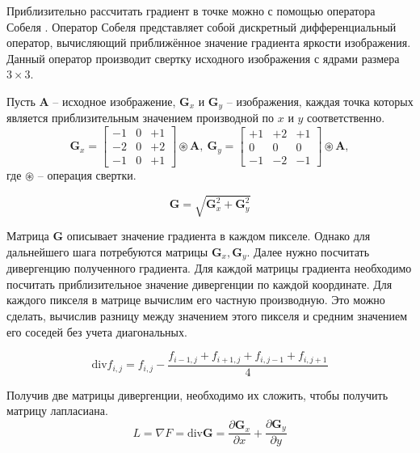 Приблизительно рассчитать градиент в точке можно с помощью оператора Собеля \cite{SobelOperator}. Оператор Собеля представляет собой дискретный дифференциальный оператор, вычисляющий приближённое значение градиента яркости изображения. Данный оператор производит свертку исходного изображения с ядрами размера $3 \times 3$.

Пусть \textbf{A} -- исходное изображение, $\textbf{G}_x$ и $\textbf{G}_y$ -- изображения, каждая точка которых является приблизительным значением производной по $x$ и $y$ соответственно.
\begin{equation}
	\textbf{G}_x =
	\begin{bmatrix}
		-1 & 0 & +1\\
		-2 & 0 & +2\\
		-1 & 0 & +1
	\end{bmatrix}
	\circledast \textbf{A},\ 
	\textbf{G}_y =
	\begin{bmatrix}
		+1 & +2 & +1\\
		0 & 0 & 0\\
		-1 & -2 & -1
	\end{bmatrix}
	\circledast \textbf{A},
\end{equation}
где $\circledast$ -- операция свертки.

\begin{equation}
	\textbf{G} = \sqrt{\textbf{G}_x^2 + \textbf{G}_y^2}
\end{equation}

Матрица \textbf{G} описывает значение градиента в каждом пикселе. Однако для дальнейшего шага потребуются матрицы $\textbf{G}_x, \textbf{G}_y$. Далее нужно посчитать дивергенцию полученного градиента. Для каждой матрицы градиента необходимо посчитать приблизительное значение дивергенции по каждой координате. Для каждого пикселя в матрице вычислим его частную производную. Это можно сделать, вычислив разницу между значением этого пикселя и средним значением его соседей без учета диагональных.

\begin{equation}
	\text{div} f_{i,j} = f_{i,j} - \dfrac{f_{i-1,j} + f_{i+1,j} + f_{i,j-1} + f_{i,j+1}}{4}
\end{equation}

Получив две матрицы дивергенции, необходимо их сложить, чтобы получить матрицу лапласиана. 
\begin{equation}
	L = \nabla F = \text{div} \textbf{G} = \frac{\partial \textbf{G}_x}{\partial x} + \frac{\partial \textbf{G}_y}{\partial y}
\end{equation}

